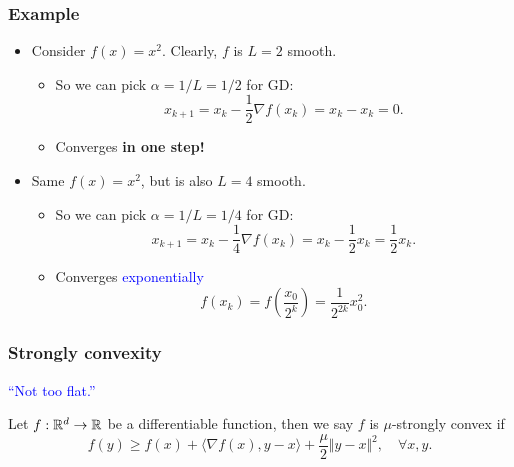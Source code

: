 \documentclass{beamer}
\begin{document}
\begin{frame}
  \frametitle{Example}

  \begin{itemize}
    \item Consider $f(x) = x^2$. Clearly, $f$ is $L=2$ smooth.
          \begin{itemize}
            \item So we can pick $\alpha=1/L = 1/2$ for GD:
                  \begin{equation}
                    x_{k+1} = x_k - \frac12 \nabla f(x_k) = x_k -x_k = 0.
                  \end{equation}
            \item Converges \textbf{in one step!}
          \end{itemize}
    \item Same $f(x)=x^2$, but is also $L=4$ smooth.
          \begin{itemize}
            \item So we can pick $\alpha=1/L = 1/4$ for GD:
                  \begin{equation}
                    x_{k+1} = x_k - \frac14 \nabla f(x_k) = x_k -\frac12 x_k = \frac12 x_k.
                  \end{equation}
            \item Converges \textcolor{blue}{exponentially}
                  \begin{equation}
                    f(x_k) = f\left(\frac{x_0}{2^k}\right) = \frac{1}{2^{2k}} x_0^2.
                  \end{equation}
           \end{itemize}
  \end{itemize}

\end{frame}


\begin{frame}
  \frametitle{Strongly convexity}

  \begin{center}
    \textcolor{blue}{``Not too flat.''}
  \end{center}


  \begin{block}[Recall]
    Let $f: \mathbb{R}^d \to \mathbb{R}$ be a differentiable function, then we say $f$ is $\mu$-strongly convex if
    \begin{equation}
      f(y) \ge f(x) + \langle \nabla f(x), y-x \rangle + \frac{\mu}{2} \Vert y-x \Vert^2, \quad \forall x,y.
    \end{equation}
  \end{block}

\end{frame}
\end{document}
